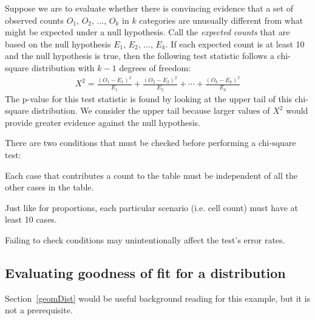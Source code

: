 \begin{termBox}{
Suppose we are to evaluate whether there is convincing evidence that a set of observed counts $O_1$, $O_2$, ..., $O_k$ in $k$ categories are unusually different from what might be expected under a null hypothesis. Call the \emph{expected counts} that are based on the null hypothesis $E_1$, $E_2$, ..., $E_k$. If each expected count is at least 10 and the null hypothesis is true, then the following test statistic follows a chi-square distribution with $k-1$ degrees of freedom:
\begin{align*}
X^2 = \frac{(O_1 - E_1)^2}{E_1} + \frac{(O_2 - E_2)^2}{E_2} + \cdots + \frac{(O_k - E_k)^2}{E_k}
\end{align*}
The p-value for this test statistic is found by looking at the upper tail of this chi-square distribution. We consider the upper tail because larger values of $X^2$ would provide greater evidence against the null hypothesis.}
\end{termBox}

\begin{tipBox}{
There are two conditions that must be checked before performing a chi-square test:\vspace{-1mm}
\begin{description}
\setlength{\itemsep}{0mm}
\item[Independence.] Each case that contributes a count to the table must be independent of all the other cases in the table.
\item[Sample size / distribution.] Just like for proportions, each particular scenario (i.e. cell count) must have at least 10 cases. %
\vspace{-1mm}
\end{description}
Failing to check conditions may unintentionally affect the test's error rates.}
\end{tipBox}

\vspace{-9mm}

\subsection{Evaluating goodness of fit for a distribution}

Section~\ref{geomDist} would be useful background reading for this example, but it is not a prerequisite.

